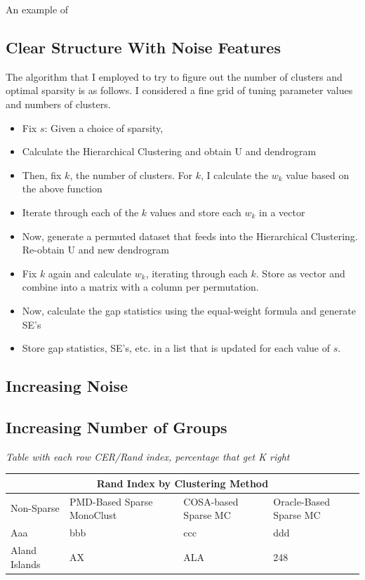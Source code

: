 \documentclass[
]{article}
\providecommand{\tightlist}{%
  \setlength{\itemsep}{0pt}\setlength{\parskip}{0pt}}
\begin{document}
An example of

\hypertarget{clear-structure-with-noise-features}{%
\subsection{Clear Structure With Noise
Features}\label{clear-structure-with-noise-features}}

The algorithm that I employed to try to figure out the number of
clusters and optimal sparsity is as follows. I considered a fine grid of
tuning parameter values and numbers of clusters.

\begin{itemize}
\tightlist
\item
  Fix \(s\): Given a choice of sparsity,
\item
  Calculate the Hierarchical Clustering and obtain U and dendrogram
\item
  Then, fix \(k\), the number of clusters. For \(k\), I calculate the
  \(w_k\) value based on the above function
\item
  Iterate through each of the \(k\) values and store each \(w_k\) in a
  vector
\item
  Now, generate a permuted dataset that feeds into the Hierarchical
  Clustering. Re-obtain U and new dendrogram
\item
  Fix \(k\) again and calculate \(w_k\), iterating through each \(k\).
  Store as vector and combine into a matrix with a column per
  permutation.
\item
  Now, calculate the gap statistics using the equal-weight formula and
  generate SE's
\item
  Store gap statistics, SE's, etc. in a list that is updated for each
  value of \(s\).
\end{itemize}

\hypertarget{increasing-noise}{%
\subsection{Increasing Noise}\label{increasing-noise}}

\hypertarget{increasing-number-of-groups}{%
\subsection{Increasing Number of
Groups}\label{increasing-number-of-groups}}

\emph{Table with each row CER/Rand index, percentage that get K right}

\begin{tabular}{ |p{3cm}|p{3cm}|p{3cm}|p{3cm}|  }
 \hline
 \multicolumn{4}{|c|}{Rand Index by Clustering Method} \\
 \hline
 Non-Sparse & PMD-Based Sparse MonoClust & COSA-based Sparse MC & Oracle-Based Sparse MC \\
 \hline
 Aaa   & bbb    & ccc &   ddd \\
 Aland Islands&   AX  & ALA   &248\\

 \hline
\end{tabular}
\end{document}
